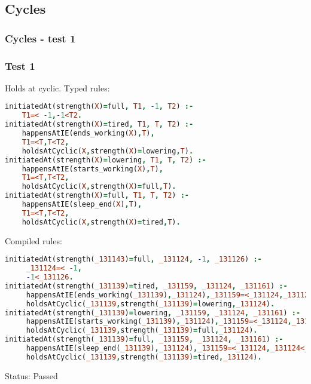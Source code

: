 \documentclass[8pt]{beamer}
\begin{document}
\subsection{Cycles}
\begin{frame}[fragile]
\frametitle{Cycles - test 1}
\subsubsection{Test 1}
\small
Holds at cyclic.\linebreak
Typed rules:
\begin{tiny}
\begin{lstlisting}[language=Prolog]
initiatedAt(strength(X)=full, T1, -1, T2) :-
    T1=< -1,-1<T2.
initiatedAt(strength(X)=tired, T1, T, T2) :-
    happensAtIE(ends_working(X),T),
    T1=<T,T<T2,
    holdsAtCyclic(X,strength(X)=lowering,T).
initiatedAt(strength(X)=lowering, T1, T, T2) :-
    happensAtIE(starts_working(X),T),
    T1=<T,T<T2,
    holdsAtCyclic(X,strength(X)=full,T).
initiatedAt(strength(X)=full, T1, T, T2) :-
    happensAtIE(sleep_end(X),T),
    T1=<T,T<T2,
    holdsAtCyclic(X,strength(X)=tired,T).
\end{lstlisting}
\end{tiny}
Compiled rules:
\begin{tiny}
\begin{lstlisting}[language=Prolog]
initiatedAt(strength(_131143)=full, _131124, -1, _131126) :-
     _131124=< -1,
     -1<_131126.
initiatedAt(strength(_131139)=tired, _131159, _131124, _131161) :-
     happensAtIE(ends_working(_131139),_131124),_131159=<_131124,_131124<_131161,
     holdsAtCyclic(_131139,strength(_131139)=lowering,_131124).
initiatedAt(strength(_131139)=lowering, _131159, _131124, _131161) :-
     happensAtIE(starts_working(_131139),_131124),_131159=<_131124,_131124<_131161,
     holdsAtCyclic(_131139,strength(_131139)=full,_131124).
initiatedAt(strength(_131139)=full, _131159, _131124, _131161) :-
     happensAtIE(sleep_end(_131139),_131124),_131159=<_131124,_131124<_131161,
     holdsAtCyclic(_131139,strength(_131139)=tired,_131124).
\end{lstlisting}
\end{tiny}
Status: Passed
\end{frame}
\end{document}
